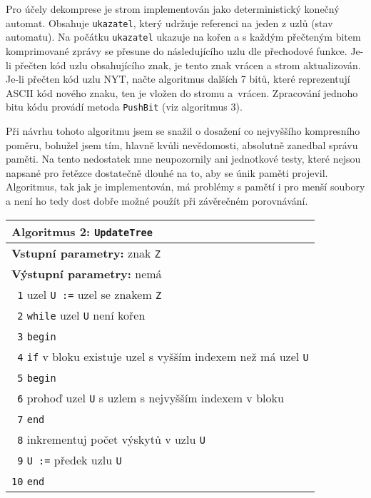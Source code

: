 Pro účely dekomprese je strom implementován jako deterministický konečný automat. Obsahuje \texttt{ukazatel}, který udržuje referenci na jeden z uzlů (stav automatu). Na počátku \texttt{ukazatel} ukazuje na kořen a s každým přečteným bitem komprimované zprávy se přesune do následujícího uzlu dle přechodové funkce. Je-li přečten kód uzlu obsahujícího znak, je tento znak vrácen a strom aktualizován. Je-li přečten kód uzlu NYT, načte algoritmus dalších 7 bitů, které reprezentují ASCII kód nového znaku, ten je vložen do stromu a~vrácen. Zpracování jednoho bitu kódu provádí metoda \texttt{PushBit} (viz algoritmus 3).

\newpage
Při návrhu tohoto algoritmu jsem se snažil o dosažení co nejvyššího kompresního poměru, bohužel jsem tím, hlavně kvůli nevědomosti, absolutně zanedbal správu paměti. Na tento nedostatek mne neupozornily ani jednotkové testy, které nejsou napsané pro řetězce dostatečně dlouhé na to, aby se únik paměti projevil. Algoritmus, tak jak je implementován, má problémy s pamětí i pro menší soubory a není ho tedy dost dobře možné použít při závěrečném porovnávání.

\begin{table}[!h]
\centering
\begin{tabular}{|l|}
\hline
\textbf{Algoritmus 2:} \texttt{UpdateTree}\\
\hline
\textbf{Vstupní parametry:} znak \texttt{Z}\\
\textbf{Výstupní parametry:} nemá\\
\hline
\texttt{ 1} uzel \texttt{U :=} uzel se znakem \texttt{Z}\\
\texttt{ 2} \texttt{while} uzel \texttt{U} není kořen\\
\texttt{ 3} \texttt{begin}\\
\texttt{ 4} \hspace*{5mm}\texttt{if} v bloku existuje uzel s vyšším indexem než má uzel \texttt{U}\\
\texttt{ 5} \hspace*{5mm}\texttt{begin}\\
\texttt{ 6} \hspace*{10mm}prohoď uzel \texttt{U} s uzlem s nejvyšším indexem v bloku\\
\texttt{ 7} \hspace*{5mm}\texttt{end}\\
\texttt{ 8} \hspace*{5mm}inkrementuj počet výskytů v uzlu \texttt{U}\\
\texttt{ 9} \hspace*{5mm}\texttt{U :=} předek uzlu \texttt{U}\\
\texttt{10} \texttt{end}\\
\hline
\end{tabular}
\end{table}


